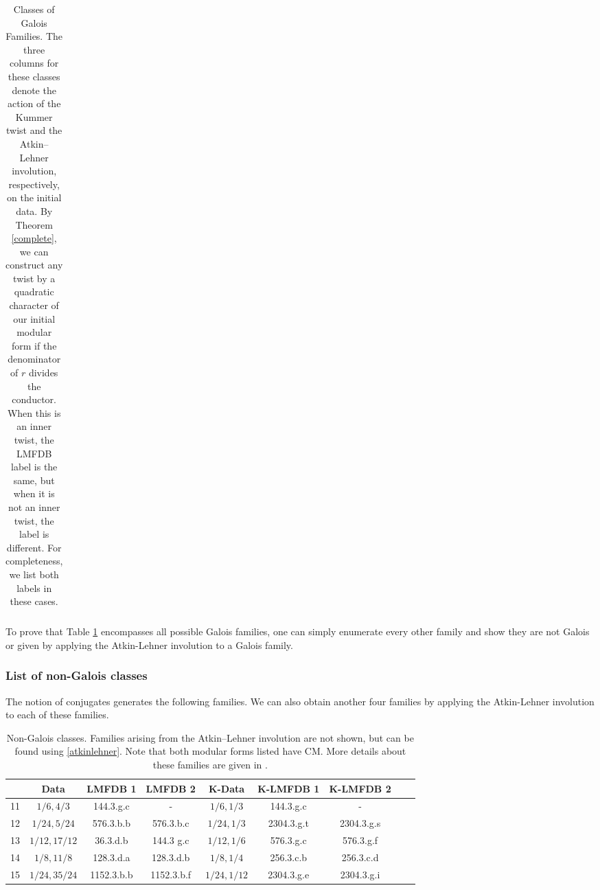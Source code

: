 \documentclass[12pt]{amsart}
\theoremstyle{definition}
\theoremstyle{remark}
\begin{document}
\begin{table}[ht]
\begin{center}
\begin{tabular}{c|cc|cc|c|c}
     
      
    \end{tabular}
\end{center}
    \caption{Classes of Galois Families. The three columns for these classes denote the action of the Kummer twist and the Atkin--Lehner involution, respectively, on the initial data. By Theorem \ref{complete}, we can construct any twist by a quadratic character of our initial modular form if the denominator of $r$ divides the conductor.  When this is an inner twist, the LMFDB label is the same, but when it is not an inner twist, the label is different. For completeness, we list both labels in these cases. }
    \label{tab}
\end{table} 



 
 To prove that Table \ref{tab} encompasses all possible Galois families, one can simply enumerate every other family and show they are not Galois or given by applying the Atkin-Lehner involution to a Galois family.
 
\subsubsection{List of non-Galois classes}
 The notion of conjugates generates the following families. We can also obtain another four families by applying the Atkin-Lehner involution to each of these families. 
\begin{table}[ht]
    \centering
    \begin{tabular}{ccccccccc}
        & Data  & LMFDB 1 & LMFDB 2 & K-Data & K-LMFDB 1 & K-LMFDB 2\\\hline
        11 & $1/6,4/3$ & 144.3.g.c & - & $1/6,1/3$ & 144.3.g.c & -\\\hline
        12 & $1/24,5/24$ & 576.3.b.b & 576.3.b.c & $1/24,1/3$ &2304.3.g.t &2304.3.g.s\\\hline
        13 & $1/12,17/12$ &36.3.d.b  & 144.3 g.c & $1/12,1/6$ & 576.3.g.c & 576.3.g.f \\\hline
        14 & $1/8,11/8$ & 128.3.d.a & 128.3.d.b & $1/8,1/4$ & 256.3.c.b & 256.3.c.d\\\hline
        15 & $1/24,35/24$ & 1152.3.b.b & 1152.3.b.f & $1/24,1/12$ &2304.3.g.e & 2304.3.g.i\\
    \end{tabular}
    \caption{Non-Galois classes. Families arising from the Atkin--Lehner involution are not shown, but can be found using \eqref{atkinlehner}. Note that both modular forms listed have CM. More details about these families are given in \cite{rosen2}.}
    \label{nongalois}
\end{table}
\end{document}

